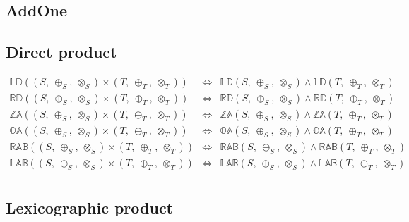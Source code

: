\documentclass[10pt]{report}
\newcommand{\propname}[1]{{\mathbb{#1}}}
\begin{document}
\subsection{AddOne} 





\subsection{Direct product} 

\[
\begin{array}{rcl} 
\propname{LD}((S,\ \oplus_S,\ \otimes_S) \times (T,\ \oplus_T,\ \otimes_T)) 
   & \Leftrightarrow %
   & \propname{LD}(S,\ \oplus_S,\ \otimes_S) \wedge \propname{LD}(T,\ \oplus_T,\ \otimes_T)\\ 
\propname{RD}((S,\ \oplus_S,\ \otimes_S) \times (T,\ \oplus_T,\ \otimes_T)) 
   & \Leftrightarrow %
   & \propname{RD}(S,\ \oplus_S,\ \otimes_S) \wedge \propname{RD}(T,\ \oplus_T,\ \otimes_T) 
  \\ 
\propname{ZA}((S,\ \oplus_S,\ \otimes_S) \times (T,\ \oplus_T,\ \otimes_T)) 
    & \Leftrightarrow %
    & \propname{ZA}(S,\ \oplus_S,\ \otimes_S) \wedge \propname{ZA}(T,\ \oplus_T,\ \otimes_T)
   \\
\propname{OA}((S,\ \oplus_S,\ \otimes_S) \times (T,\ \oplus_T,\ \otimes_T)) 
    & \Leftrightarrow %
    & \propname{OA}(S,\ \oplus_S,\ \otimes_S) \wedge \propname{OA}(T,\ \oplus_T,\ \otimes_T)
   \\
\propname{RAB}((S,\ \oplus_S,\ \otimes_S) \times (T,\ \oplus_T,\ \otimes_T)) 
    & \Leftrightarrow %
    & \propname{RAB}(S,\ \oplus_S,\ \otimes_S) \wedge  \propname{RAB}(T,\ \oplus_T,\ \otimes_T) 
    \\ 
\propname{LAB}((S,\ \oplus_S,\ \otimes_S) \times (T,\ \oplus_T,\ \otimes_T)) 
    & \Leftrightarrow %
    & \propname{LAB}(S,\ \oplus_S,\ \otimes_S) \wedge \propname{LAB}(T,\ \oplus_T,\ \otimes_T)
    \\ 
\end{array} 
\]



\subsection{Lexicographic product} 


\end{document}
